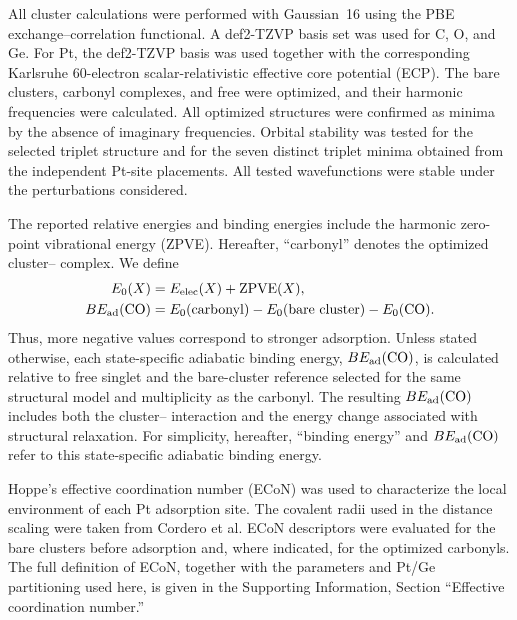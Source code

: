 All cluster calculations were performed with Gaussian~16\cite{g16}
using the PBE exchange--correlation functional\cite{perdew:pbe:1996}.
A def2-TZVP basis set was used for C, O, and Ge. For Pt, the def2-TZVP
basis was used together with the corresponding Karlsruhe 60-electron
scalar-relativistic effective core potential
(ECP)\cite{weigend:def2:2005,andrae:epp:1990}.
The bare clusters, carbonyl complexes, and free  were optimized, and
their harmonic frequencies were calculated. All optimized structures
were confirmed as minima by the absence of imaginary frequencies.
Orbital stability was tested for the selected triplet  structure
and for the seven distinct triplet  minima obtained from the
independent Pt-site placements. All tested wavefunctions were stable under
the perturbations considered.


The reported relative energies and  binding
energies include the harmonic zero-point vibrational energy (ZPVE).
Hereafter, ``carbonyl'' denotes the optimized cluster-- complex. We define
\begin{align}
E_0(X) &= E_{\rm elec}(X)+\mathrm{ZPVE}(X),\\
BE_{\rm ad}(\ce{CO}) &= E_0(\mathrm{carbonyl})
              -E_0(\mathrm{bare\ cluster})-E_0(\ce{CO}).
\label{eq:neutral_dft_be}
\end{align}
Thus, more negative values correspond to stronger adsorption.
Unless stated otherwise, each state-specific adiabatic  binding energy, \(BE_{\rm ad}(\ce{CO})\), is calculated relative to free singlet  and the bare-cluster reference selected for the same structural model and multiplicity as the carbonyl. The resulting \(BE_{\rm ad}(\ce{CO})\) includes both the cluster-- interaction and the energy change associated with structural relaxation.
For simplicity, hereafter, ``binding energy'' and \(BE_{\rm ad}(\ce{CO})\) refer
to this state-specific adiabatic  binding energy.

Hoppe’s effective coordination number (ECoN) was used to characterize the local
environment of each Pt adsorption site\cite{hoppe:econ:1979}. The covalent radii
used in the distance scaling were taken from Cordero et
al\cite{cordero:covalent-radii:2008}. ECoN descriptors were evaluated for the bare clusters before  adsorption and, where indicated, for the optimized carbonyls. The full definition of ECoN, together with the parameters and Pt/Ge partitioning used here, is given in the Supporting Information, Section ``Effective coordination number.''

